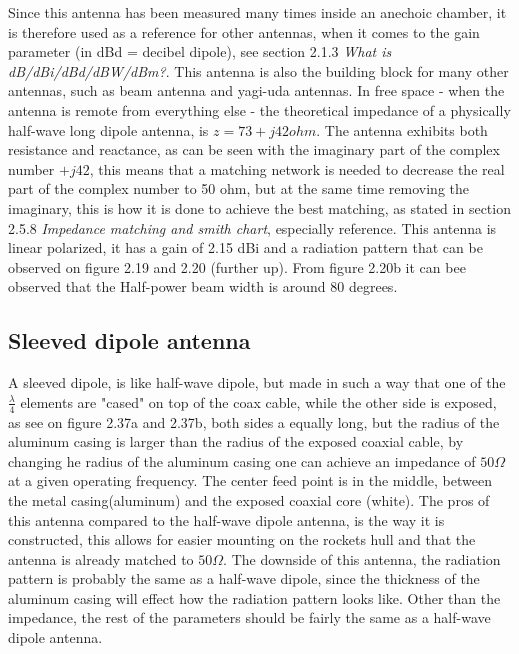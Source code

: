 Since this antenna has been measured many times inside an anechoic chamber, it is therefore used as a reference for other antennas, when it comes to the gain parameter (in dBd = decibel dipole), see section 2.1.3 \textit{What is dB/dBi/dBd/dBW/dBm?}. This antenna is also the building block for many other antennas, such as beam antenna and yagi-uda antennas. In free space - when the antenna is remote from everything else - the theoretical impedance of a physically half-wave long dipole antenna, is $z=73+j42ohm$. The antenna exhibits both resistance and reactance, as can be seen with the imaginary part of the complex number $+j42$, this means that a matching network is needed to decrease the real part of the complex number to 50 ohm, but at the same time removing the imaginary, this is how it is done to achieve the best matching, as stated in section 2.5.8 \textit{Impedance matching and smith chart}, especially reference\cite{ImpedanceMatching}. This antenna is linear polarized, it has a gain of 2.15 dBi and a radiation pattern that can be observed on figure 2.19 and 2.20 (further up). From figure 2.20b it can bee observed that the Half-power beam width is around 80 degrees. 

\subsection{Sleeved dipole antenna}
A sleeved dipole, is like half-wave dipole, but made in such a way that one of the $\frac{\lambda}{4}$ elements are "cased" on top of the coax cable, while the other side is exposed, as see on figure 2.37a and 2.37b, both sides a equally long, but the radius of the aluminum casing is larger than the radius of the exposed coaxial cable, by changing he radius of the aluminum casing one can achieve an impedance of $50\Omega$ at a given operating frequency. The center feed point is in the middle, between the metal casing(aluminum) and the exposed coaxial core (white). The pros of this antenna compared to the half-wave dipole antenna, is the way it is constructed, this allows for easier mounting on the rockets hull and that the antenna is already matched to $50\Omega$. The downside of this antenna, the radiation pattern is probably the same as a half-wave dipole, since the thickness of the aluminum casing will effect how the radiation pattern looks like. Other than the impedance, the rest of the parameters should be fairly the same as a half-wave dipole antenna. 

